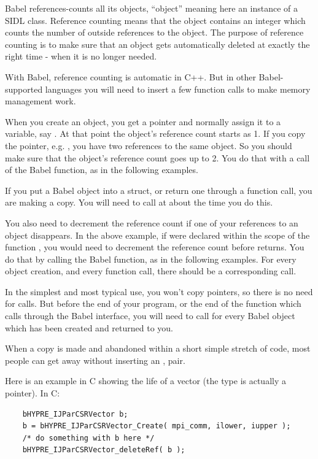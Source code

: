 Babel references-counts all its objects, ``object'' meaning here an
instance of a SIDL class.  Reference counting means that the object
contains an integer which counts the number of outside references to
the object.  The purpose of reference counting is to make sure that an
object gets automatically deleted at exactly the right time - when it
is no longer needed.

With Babel, reference counting is automatic in C++.  But in other
Babel-supported languages you will need to insert a few function calls
to make memory management work.

When you create an object, you get a pointer and normally assign it to
a variable, say .  At that point the object's reference
count starts as 1.  If you copy the pointer,
e.g. , you have two references to the same
object.  So you should make sure that the object's reference count
goes up to 2.  You do that with a call of the Babel 
function, as in the following examples.

If you put a Babel object into a struct, or return one through a
function call, you are making a copy.  You will need to call
 at about the time you do this.

You also need to decrement the reference count if one of your
references to an object disappears.  In the above example, if
 were declared within the scope of the function
, you would need to decrement the reference count
before  returns.  You do that by calling the Babel
 function, as in the following examples.  For every
object creation, and every  function call, there should
be a corresponding  call.

In the simplest and most typical use, you won't copy pointers, so
there is no need for  calls.  But before the end of your
program, or the end of the function which calls \hypre{} through the
Babel interface, you will need to call  for every
Babel object which has been created and returned to you.

When a copy is made and abandoned within a short simple stretch of
code, most people can get away without inserting an ,
 pair.

Here is an example in C showing the life of a vector (the type
 is actually a pointer).  In C:
\begin{verbatim}
    bHYPRE_IJParCSRVector b;
    b = bHYPRE_IJParCSRVector_Create( mpi_comm, ilower, iupper );
    /* do something with b here */
    bHYPRE_IJParCSRVector_deleteRef( b );
\end{verbatim}

